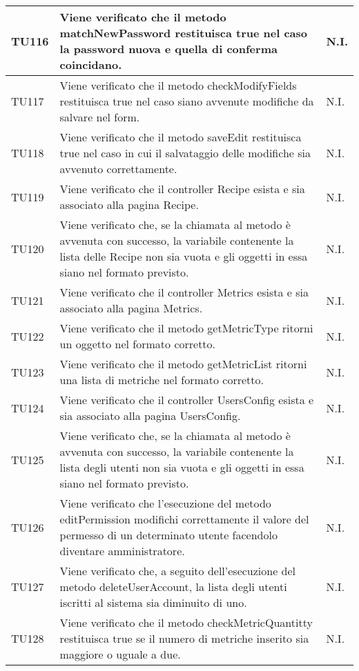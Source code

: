 \begin{center}
\begin{longtable}{| p{2cm} | p{8cm} | p{2.5cm} |}
					\hline
					TU116 & Viene verificato che il metodo matchNewPassword restituisca true nel caso la password nuova e quella di conferma coincidano. & N.I.\\
					\hline
					TU117 & Viene verificato che il metodo checkModifyFields restituisca true nel caso siano avvenute modifiche da salvare nel form. & N.I.\\
					\hline
					TU118 & Viene verificato che il metodo saveEdit restituisca true nel caso in cui il salvataggio delle modifiche sia avvenuto correttamente. & N.I.\\
					\hline
					TU119 & Viene verificato che il controller Recipe esista e sia associato alla pagina Recipe. & N.I.\\
					\hline
					TU120 & Viene verificato che, se la chiamata al metodo è avvenuta con successo, la variabile contenente la lista delle Recipe non sia vuota e gli oggetti in essa siano nel formato previsto. & N.I.\\
					\hline
					TU121 & Viene verificato che il controller Metrics esista e sia associato alla pagina Metrics. & N.I.\\
					\hline
					TU122 & Viene verificato che il metodo getMetricType ritorni un oggetto nel formato corretto. & N.I.\\
					\hline
					TU123 & Viene verificato che il metodo getMetricList ritorni una lista di metriche nel formato corretto. & N.I.\\
					\hline
					TU124 & Viene verificato che il controller UsersConfig esista e sia associato alla pagina UsersConfig. & N.I.\\
					\hline
					TU125 & Viene verificato che, se la chiamata al metodo è avvenuta con successo, la variabile contenente la lista degli utenti non sia vuota e gli oggetti in essa siano nel formato previsto. & N.I.\\
					\hline
					TU126 & Viene verificato che l'esecuzione del metodo editPermission modifichi correttamente il valore del permesso di un determinato utente facendolo diventare amministratore. & N.I.\\
					\hline
					TU127 & Viene verificato che, a seguito dell'esecuzione del metodo deleteUserAccount, la lista degli utenti iscritti al sistema sia diminuito di uno. & N.I.\\
					\hline
					TU128 & Viene verificato che il metodo checkMetricQuantitty restituisca true se il numero di metriche inserito sia maggiore o uguale a due. & N.I.\\
					\hline

\end{longtable}
\end{center}
